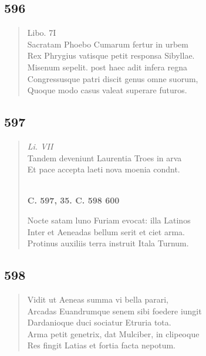 \documentclass[11pt, a4paper]{report}
\begin{document}
            \subsection*{596}
      \begin{verse}
      Libo. 7I \\ Sacratam Phoebo Cumarum fertur in urbem \\ Rex Phrygius vatisque petit responsa Sibyllae. \\ Misenum sepelit. post haec adit infera regna \\ Congressusque patri discit genus omne suorum, \\ Quoque modo casus valeat superare futuros. \\ 
      \end{verse}
  
            \subsection*{597}
      \begin{verse}
      \textit{Li. VII} \\ Tandem deveniunt Laurentia Troes in arva \\ Et pace accepta laeti nova moenia condnt. \\ 
        ﻿\pagebreak 
    \begin{center} \textbf{C. 597, 35. C. 598 600} \end{center} \marginpar{[85]} Nocte satam luno Furiam evocat: illa Latinos \\ Inter et Aeneadas bellum serit et ciet arma. \\ Protinus auxiliis terra instruit Itala Turnum. \\ 
      \end{verse}
  
            \subsection*{598}
      \begin{verse}
      Vidit ut Aeneas summa vi bella parari, \\ Arcadas Euandrumque senem sibi foedere iungit \\ Dardanioque duci sociatur Etruria tota. \\ Arma petit genetrix, dat Mulciber, in clipeoque \\ Res fingit Latias et fortia facta nepotum. \\ 
      \end{verse}
  
\end{document}
